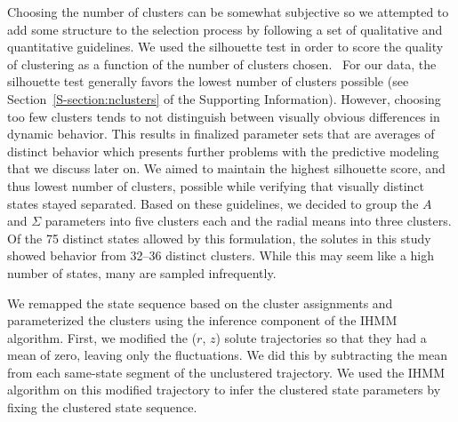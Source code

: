 \documentclass[journal=jpcbfk,manuscript=article]{achemso}
\begin{document}
  Choosing the number of clusters can be somewhat subjective so
  we attempted to add some structure to the selection process by following
  a set of qualitative and quantitative guidelines. We used the silhouette 
  test in order to score the quality of clustering as a function of the number 
  of clusters chosen.~\cite{kaufman_finding_2009} For our data, the silhouette test generally favors the 
  lowest number of clusters possible (see Section~\ref{S-section:nclusters} of
  the Supporting Information). However, choosing too few clusters tends to 
  not distinguish between visually obvious differences in 
  dynamic behavior. This results in finalized parameter sets that are averages of
  distinct behavior which presents further problems with the predictive modeling
  that we discuss later on. We aimed to maintain the highest silhouette score,
  and thus lowest number of clusters, possible while verifying that visually 
  distinct states stayed separated. Based on these guidelines, we decided to 
  group the $A$ and $\Sigma$ parameters into five clusters each and the radial
  means into three clusters. Of the 75 distinct states allowed by this formulation,
  the solutes in this study showed behavior from 32--36 distinct clusters. While
  this may seem like a high number of states, many are sampled infrequently.

  We remapped the state sequence based on the cluster assignments and parameterized
  the clusters using the inference component of the IHMM algorithm. 
  First, we modified the ($r$, $z$) solute trajectories so that they had a mean of zero,
  leaving only the fluctuations. We did this by subtracting the mean from each 
  same-state segment of the unclustered trajectory. We used the IHMM algorithm on this
  modified trajectory to infer the clustered state parameters by fixing the clustered 
  state sequence. 
  
\end{document}
